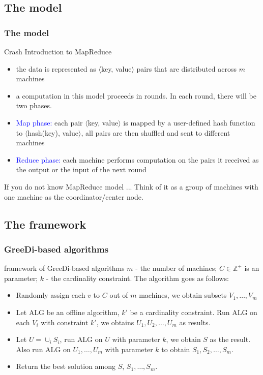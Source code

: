 \documentclass{beamer}
\newcommand{\bbZ}{\mathbb{Z}}
\newcommand{\alg}{\text{ALG}}
\newcommand{\emRed}[1][]{\textcolor{blue} #1}
\begin{document}
\subsection{The model}
\begin{frame}
  \frametitle{The model}
  \begin{block}{Crash Introduction to MapReduce}
  
  \begin{itemize}
  \item the data is represented as $\langle$key, value$\rangle$ pairs that are distributed across $m$ machines
    \item a computation in this model proceeds in rounds. In each round, there will be two phases.
      \item \emRed{Map phase:} each pair $\langle$key, value$\rangle$ is mapped by a user-defined hash function to $\langle$hash(key), value$\rangle$, all pairs are then shuffled and sent to different machines
      \item \emRed{Reduce phase:} each machine performs computation on the pairs it received as the output or the input of the next round
  \end{itemize}
  \end{block}
  \pause
  \begin{block}{If you do not know MapReduce model ...}
    Think of it as a group of machines with one machine as the coordinator/center node.    
  \end{block}
\end{frame}

\subsection{The framework}

\begin{frame}
  \frametitle{{\sc GreeDi}-based algorithms}
  \begin{block}{framework of {\sc GreeDi}-based algorithms}
    $m$ -  the number of machines; $C \in \bbZ^+$ is an parameter;  $k$ - the cardinality constraint. The algorithm goes as follows:
    \begin{itemize}
    \item Randomly assign each $v$ to $C$ out of $m$ machines, we obtain subsets $V_1, \ldots, V_m$
    \item Let $\alg$ be an offline algorithm, $k'$ be a cardinality constraint. Run $\alg$ on each $V_i$ with constraint $k'$, we obtains $U_1, U_2, \ldots, U_m$ as results.
    \item Let $U = \cup_i S_i$, run $\alg$ on $U$ with parameter $k$, we obtain $S$ as the result. Also run $\alg$ on $U_1, \ldots, U_m$ with parameter $k$ to obtain $S_1, S_2, \ldots, S_m$.
    \item Return the best solution among $S$, $S_1, \ldots, S_m$.
    \end{itemize}

  \end{block}
\end{frame}
\end{document}
